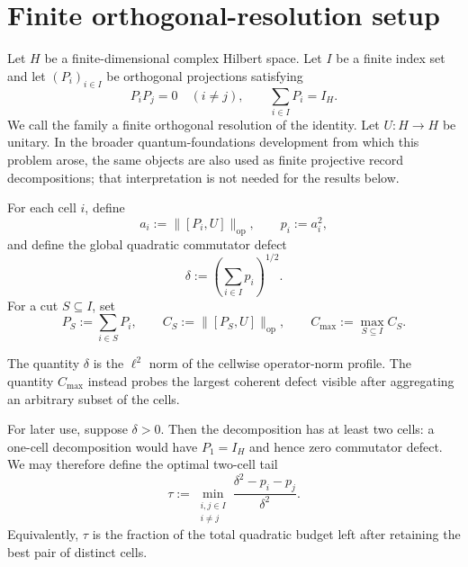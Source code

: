 \documentclass[11pt]{article}
\newcommand{\op}{\mathrm{op}}
\newcommand{\cmax}{C_{\max}}
\newcommand{\dd}{\delta}
\newcommand{\tauq}{\tau}
\begin{document}

\section{Finite orthogonal-resolution setup}

Let $H$ be a finite-dimensional complex Hilbert space.  Let
$I$ be a finite index set and let $(P_i)_{i\in I}$ be orthogonal projections
satisfying
\begin{equation}\label{eq:decomp}
  P_iP_j=0\quad(i\neq j),
  \qquad
  \sum_{i\in I}P_i=I_H.
\end{equation}
We call the family a finite orthogonal resolution of the identity.  Let
$U:H\to H$ be unitary.  In the broader quantum-foundations development from
which this problem arose, the same objects are also used as finite projective
record decompositions; that interpretation is not needed for the results
below.

For each cell $i$, define
\begin{equation}\label{eq:ai}
  a_i:=\|[P_i,U]\|_{\op},
  \qquad
  p_i:=a_i^2,
\end{equation}
and define the global quadratic commutator defect
\begin{equation}\label{eq:delta}
  \dd:=\left(\sum_{i\in I}p_i\right)^{1/2}.
\end{equation}
For a cut $S\subseteq I$, set
\begin{equation}\label{eq:cut}
  P_S:=\sum_{i\in S}P_i,
  \qquad
  C_S:=\|[P_S,U]\|_{\op},
  \qquad
  \cmax:=\max_{S\subseteq I}C_S.
\end{equation}

The quantity $\dd$ is the $\ell^2$ norm of the cellwise operator-norm profile.
The quantity $\cmax$ instead probes the largest coherent defect visible after
aggregating an arbitrary subset of the cells.

For later use, suppose $\dd>0$.  Then the decomposition has at least two
cells: a one-cell decomposition would have $P_1=I_H$ and hence zero
commutator defect.  We may therefore define the optimal two-cell tail
\begin{equation}\label{eq:tau}
  \tauq:=
  \min_{\substack{i,j\in I\\i\neq j}}
  \frac{\dd^2-p_i-p_j}{\dd^2}.
\end{equation}
Equivalently, $\tauq$ is the fraction of the total quadratic budget left after
retaining the best pair of distinct cells.
\end{document}
